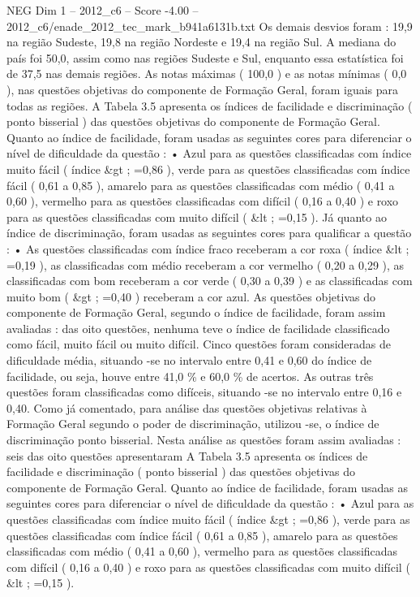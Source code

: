 \begin{textsample}{NEG Dim 1 – 2012\_c6 – Score -4.00 – 2012\_c6/enade\_2012\_tec\_mark\_b941a6131b.txt}
Os demais desvios foram : 19,9 na região Sudeste, 19,8 na região Nordeste e 19,4 na região Sul.
A mediana do país foi 50,0, assim como nas regiões Sudeste e Sul, enquanto essa estatística foi de 37,5 nas demais regiões.
As notas máximas ( 100,0 ) e as notas mínimas ( 0,0 ), nas questões objetivas do componente de Formação Geral, foram iguais para todas as regiões.
A Tabela 3.5 apresenta os índices de facilidade e discriminação ( ponto bisserial ) das questões objetivas do componente de Formação Geral.
Quanto ao índice de facilidade, foram usadas as seguintes cores para diferenciar o nível de dificuldade da questão : • Azul para as questões classificadas com índice muito fácil ( índice \&gt ; =0,86 ), verde para as questões classificadas com índice fácil ( 0,61 a 0,85 ), amarelo para as questões classificadas com médio ( 0,41 a 0,60 ), vermelho para as questões classificadas com difícil ( 0,16 a 0,40 ) e roxo para as questões classificadas com muito difícil ( \&lt ; =0,15 ).
Já quanto ao índice de discriminação, foram usadas as seguintes cores para qualificar a questão : • As questões classificadas com índice fraco receberam a cor roxa ( índice \&lt ; =0,19 ), as classificadas com médio receberam a cor vermelho ( 0,20 a 0,29 ), as classificadas com bom receberam a cor verde ( 0,30 a 0,39 ) e as classificadas com muito bom ( \&gt ; =0,40 ) receberam a cor azul.
As questões objetivas do componente de Formação Geral, segundo o índice de facilidade, foram assim avaliadas : das oito questões, nenhuma teve o índice de facilidade classificado como fácil, muito fácil ou muito difícil.
Cinco questões foram consideradas de dificuldade média, situando -se no intervalo entre 0,41 e 0,60 do índice de facilidade, ou seja, houve entre 41,0 \% e 60,0 \% de acertos.
As outras três questões foram classificadas como difíceis, situando -se no intervalo entre 0,16 e 0,40.
Como já comentado, para análise das questões objetivas relativas à Formação Geral segundo o poder de discriminação, utilizou -se, o índice de discriminação ponto bisserial.
Nesta análise as questões foram assim avaliadas : seis das oito questões apresentaram A Tabela 3.5 apresenta os índices de facilidade e discriminação ( ponto bisserial ) das questões objetivas do componente de Formação Geral.
Quanto ao índice de facilidade, foram usadas as seguintes cores para diferenciar o nível de dificuldade da questão : • Azul para as questões classificadas com índice muito fácil ( índice \&gt ; =0,86 ), verde para as questões classificadas com índice fácil ( 0,61 a 0,85 ), amarelo para as questões classificadas com médio ( 0,41 a 0,60 ), vermelho para as questões classificadas com difícil ( 0,16 a 0,40 ) e roxo para as questões classificadas com muito difícil ( \&lt ; =0,15 ).

\end{textsample}
